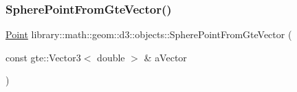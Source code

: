 \subsubsection{\texorpdfstring{Sphere\+Point\+From\+Gte\+Vector()}{SpherePointFromGteVector()}}
{\footnotesize\ttfamily \hyperlink{classlibrary_1_1math_1_1geom_1_1d3_1_1objects_1_1_point}{Point} library\+::math\+::geom\+::d3\+::objects\+::\+Sphere\+Point\+From\+Gte\+Vector (\begin{DoxyParamCaption}\item[{const gte\+::\+Vector3$<$ double $>$ \&}]{a\+Vector }\end{DoxyParamCaption})}

